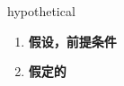 
\begin{frame}
{\huge hypothetical}
\begin{center}
\begin{enumerate}\Large
  \item \textbf{假设，前提条件}
  \item \textbf{假定的}
\end{enumerate}
\end{center}
\end{frame}
